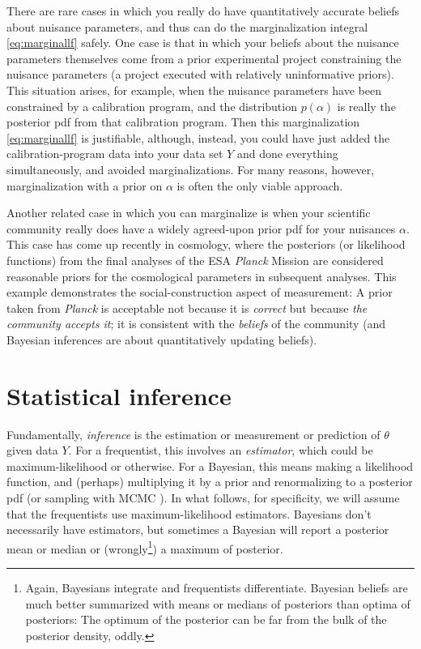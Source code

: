 \documentclass{article}
\begin{document}
There are rare cases in which you really do have quantitatively accurate beliefs about nuisance parameters, and thus can do the marginalization integral \eqref{eq:marginallf} safely.
One case is that in which your beliefs about the nuisance parameters themselves come from a prior experimental project constraining the nuisance parameters (a project executed with relatively uninformative priors).
This situation arises, for example, when the nuisance parameters have been constrained by a calibration program, and the distribution $p(\alpha)$ is really the posterior pdf from that calibration program.
Then this marginalization \eqref{eq:marginallf} is justifiable, although, instead, you could have just added the calibration-program data into your data set $Y$ and done everything simultaneously, and avoided marginalizations.
For many reasons, however, marginalization with a prior on $\alpha$ is often the only viable approach.

Another related case in which you can marginalize is when your scientific community really does have a widely agreed-upon prior pdf for your nuisances $\alpha$.
This case has come up recently in cosmology, where the posteriors (or likelihood functions) from the final analyses of the ESA \textsl{Planck} Mission \cite{planck18} are considered reasonable priors for the cosmological parameters in subsequent analyses.
This example demonstrates the social-construction aspect of measurement:
A prior taken from \textsl{Planck} is acceptable not because it is \emph{correct} but because \emph{the community accepts it}; it is consistent with the \emph{beliefs} of the community (and Bayesian inferences are about quantitatively updating beliefs).

\section{Statistical inference}\label{sec:inference}
Fundamentally, \emph{inference} is the estimation or measurement or prediction of $\theta$ given data $Y$.
For a frequentist, this involves an \emph{estimator}, which could be maximum-likelihood or otherwise.
For a Bayesian, this means making a likelihood function, and (perhaps) multiplying it by a prior and renormalizing to a posterior pdf (or sampling with MCMC \cite{mcmc}).
In what follows, for specificity, we will assume that the frequentists use maximum-likelihood estimators.
Bayesians don't necessarily have estimators, but sometimes a Bayesian will report a posterior mean or median or (wrongly\footnote{%
Again, Bayesians integrate and frequentists differentiate. Bayesian beliefs are much better summarized with means or medians of posteriors than optima of posteriors: The optimum of the posterior can be far from the bulk of the posterior density, oddly.})
a maximum of posterior.
\end{document}
